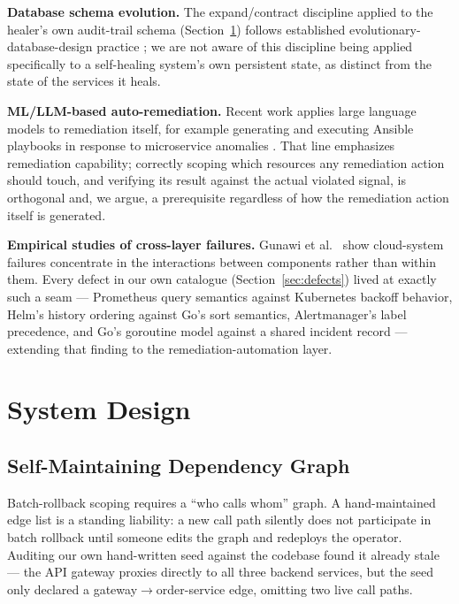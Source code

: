 \documentclass[conference]{IEEEtran}
\begin{document}
\textbf{Database schema evolution.} The expand/contract discipline applied to the healer's own audit-trail schema (Section~\ref{sec:design}) follows established evolutionary-database-design practice \cite{sadalage2006refactoring}; we are not aware of this discipline being applied specifically to a self-healing system's own persistent state, as distinct from the state of the services it heals.

\textbf{ML/LLM-based auto-remediation.} Recent work applies large language models to remediation itself, for example generating and executing Ansible playbooks in response to microservice anomalies \cite{sarda2024llm}. That line emphasizes remediation capability; correctly scoping which resources any remediation action should touch, and verifying its result against the actual violated signal, is orthogonal and, we argue, a prerequisite regardless of how the remediation action itself is generated.

\textbf{Empirical studies of cross-layer failures.} Gunawi et al.\ \cite{gunawi2014bugs} show cloud-system failures concentrate in the interactions between components rather than within them. Every defect in our own catalogue (Section~\ref{sec:defects}) lived at exactly such a seam --- Prometheus query semantics against Kubernetes backoff behavior, Helm's history ordering against Go's sort semantics, Alertmanager's label precedence, and Go's goroutine model against a shared incident record --- extending that finding to the remediation-automation layer.

\section{System Design}
\label{sec:design}

\subsection{Self-Maintaining Dependency Graph}
Batch-rollback scoping requires a ``who calls whom'' graph. A hand-maintained edge list is a standing liability: a new call path silently does not participate in batch rollback until someone edits the graph and redeploys the operator. Auditing our own hand-written seed against the codebase found it already stale --- the API gateway proxies directly to all three backend services, but the seed only declared a gateway$\rightarrow$order-service edge, omitting two live call paths.
\end{document}
